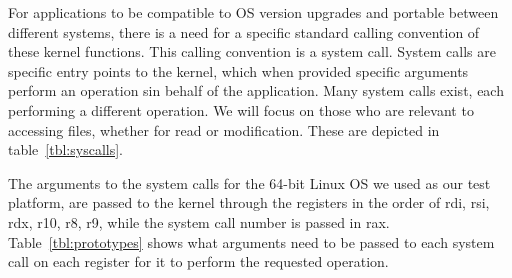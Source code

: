 \par For applications to be compatible to \ac{OS} version upgrades and portable between different systems, there is a need for a specific standard calling convention of these kernel functions. This calling convention is a system call. System calls are specific entry points to the kernel, which when provided specific arguments perform an operation sin behalf of the application. Many system calls exist, each performing a different operation. We will focus on those who are relevant to accessing files, whether for read or modification. These are depicted in table~\ref{tbl:syscalls}.
\par The arguments to the system calls for the 64-bit Linux \ac{OS} we used as our test platform, are passed to the kernel through the registers in the order of rdi, rsi, rdx, r10, r8, r9, while the system call number is passed in rax. Table~\ref{tbl:prototypes} shows what arguments need to be passed to each system call on each register for it to perform the requested operation.


